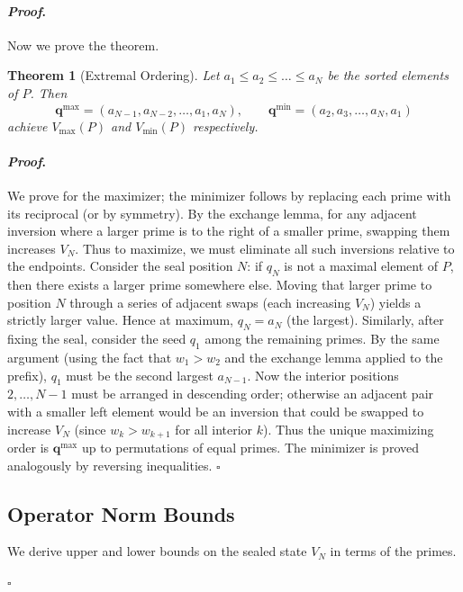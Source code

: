 \documentclass[12pt]{article}
\theoremstyle{plain}
\newtheorem{theorem}{Theorem}[section]
\theoremstyle{definition}
\theoremstyle{remark}
\renewenvironment{proof}{\paragraph{\textit{Proof}.}}{\hfill$\square$}
\begin{document}
\begin{proof}
Now we prove the theorem.

\begin{theorem}[Extremal Ordering]
Let $a_1\le a_2\le\dots\le a_N$ be the sorted elements of $P$. Then
\[
\mathbf{q}^{\max} = (a_{N-1}, a_{N-2},\dots,a_1,a_N), \qquad
\mathbf{q}^{\min} = (a_2,a_3,\dots,a_N,a_1)
\]
achieve $V_{\max}(P)$ and $V_{\min}(P)$ respectively.
\end{theorem}
\begin{proof}
We prove for the maximizer; the minimizer follows by replacing each prime with its reciprocal (or by symmetry). By the exchange lemma, for any adjacent inversion where a larger prime is to the right of a smaller prime, swapping them increases $V_N$. Thus to maximize, we must eliminate all such inversions relative to the endpoints. Consider the seal position $N$: if $q_N$ is not a maximal element of $P$, then there exists a larger prime somewhere else. Moving that larger prime to position $N$ through a series of adjacent swaps (each increasing $V_N$) yields a strictly larger value. Hence at maximum, $q_N = a_N$ (the largest). Similarly, after fixing the seal, consider the seed $q_1$ among the remaining primes. By the same argument (using the fact that $w_1 > w_2$ and the exchange lemma applied to the prefix), $q_1$ must be the second largest $a_{N-1}$. Now the interior positions $2,\dots,N-1$ must be arranged in descending order; otherwise an adjacent pair with a smaller left element would be an inversion that could be swapped to increase $V_N$ (since $w_k > w_{k+1}$ for all interior $k$). Thus the unique maximizing order is $\mathbf{q}^{\max}$ up to permutations of equal primes. The minimizer is proved analogously by reversing inequalities.
\end{proof}

\subsection{Operator Norm Bounds}

We derive upper and lower bounds on the sealed state $V_N$ in terms of the primes.


\end{proof}
\end{document}
